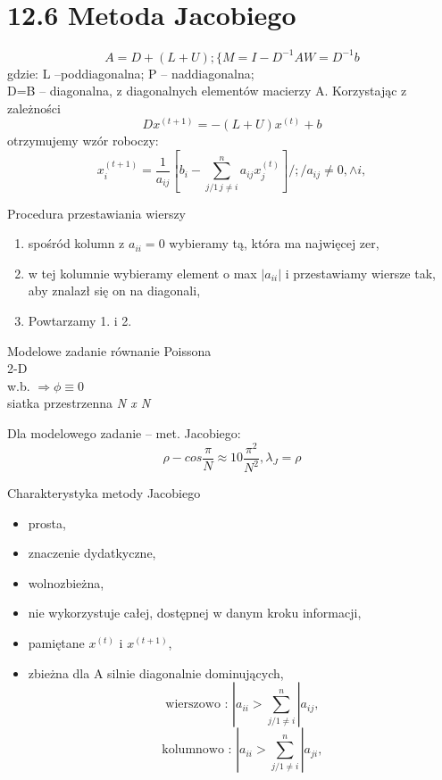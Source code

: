 \section{12.6 Metoda Jacobiego}

\begin{frame}{}
  $$ A=D+(L+U);\{M=I-D^{-1}AW=D^{-1}b $$
  gdzie: L --poddiagonalna; P -- naddiagonalna;\\
  D=B -- diagonalna, z diagonalnych elementów macierzy A. Korzystając z zależności
  $$\boxed{Dx^{(t+1)}= -(L+U)x^{(t)}+b}$$
  otrzymujemy wzór roboczy:
  $$x_i^{(t+1)}=\frac{1}{a_{ij}}[b_i-\sum_{j/1\,j\neq i}^{n} a_{ij}x_j^{(t)}]/ ;/ a_{ij} \neq 0,\wedge i,$$
\end{frame}

\begin{frame}
  \begin{block}{Procedura przestawiania wierszy}
    \begin{enumerate}
      \item spośród kolumn z $a_{ii} = 0$ wybieramy tą, która ma najwięcej zer,
      \item w tej kolumnie wybieramy element o max $|a_{ii}|$ i przestawiamy wiersze tak, aby znalazł się on na diagonali,
      \item Powtarzamy 1. i 2.
    \end{enumerate}
  \end{block}
\end{frame}

\begin{frame}{}
  \begin{block}{Modelowe zadanie}
    równanie Poissona
    \\2-D
    \\w.b. $\Rightarrow\phi\equiv 0$
    \\siatka przestrzenna \emph{N x N}
  \end{block}

  \begin{block}{Dla modelowego zadanie -- met. Jacobiego:}
    $$\rho - cos\frac{\pi}{N}\approx 1 0 \frac{\pi^2}{N^2}, \lambda _J = \rho$$
  \end{block}
\end{frame}

\begin{frame}{}
  \begin{block}{Charakterystyka metody Jacobiego}
    \begin{itemize}
      \item prosta,
      \item znaczenie dydatkyczne,
      \item wolnozbieżna,
      \item nie wykorzystuje całej, dostępnej w danym kroku informacji,
      \item pamiętane $x^{(t)}$ i $x^{(t+1)}$,
      \item zbieżna dla A silnie diagonalnie dominujących,
      $$\text{wierszowo : }|a_{ii} > \sum_{j/1\neq i}^{n} |a_{ij},$$
      $$\text{kolumnowo : }|a_{ii} > \sum_{j/1\neq i}^{n} |a_{ji},$$
    \end{itemize}
  \end{block}
\end{frame}
